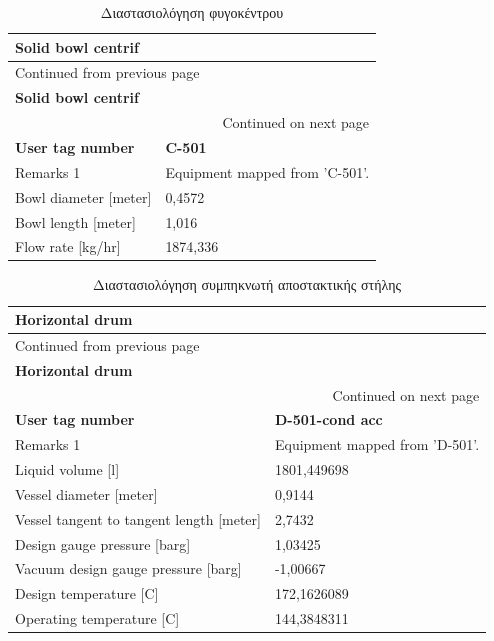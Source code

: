 \documentclass[11pt]{article}
\begin{document}
\begin{longtable}{ll}
\caption{Διαστασιολόγηση φυγοκέντρου}
\\
\textbf{Solid bowl centrif} & \\
\hline
\endfirsthead
\multicolumn{2}{l}{Continued from previous page} \\
\hline

\textbf{Solid bowl centrif} &  \\

\hline
\endhead
\hline\multicolumn{2}{r}{Continued on next page} \\
\endfoot
\endlastfoot
\hline
\textbf{User tag number} & \textbf{C-501}\\
Remarks 1 & Equipment mapped from 'C-501'.\\
Bowl diameter [meter] & 0,4572\\
Bowl length [meter] & 1,016\\
Flow rate [kg/hr] & 1874,336\\
\end{longtable}


\begin{longtable}{ll}
\caption{Διαστασιολόγηση συμπηκνωτή αποστακτικής στήλης}
\\
\textbf{Horizontal drum} & \\
\hline
\endfirsthead
\multicolumn{2}{l}{Continued from previous page} \\
\hline

\textbf{Horizontal drum} &  \\

\hline
\endhead
\hline\multicolumn{2}{r}{Continued on next page} \\
\endfoot
\endlastfoot
\hline
\textbf{User tag number} & \textbf{D-501-cond acc}\\
Remarks 1 & Equipment mapped from 'D-501'.\\
Liquid volume [l] & 1801,449698\\
Vessel diameter [meter] & 0,9144\\
Vessel tangent to tangent length [meter] & 2,7432\\
Design gauge pressure [barg] & 1,03425\\
Vacuum design gauge pressure [barg] & -1,00667\\
Design temperature [C] & 172,1626089\\
Operating temperature [C] & 144,3848311\\
\end{longtable}
\end{document}
